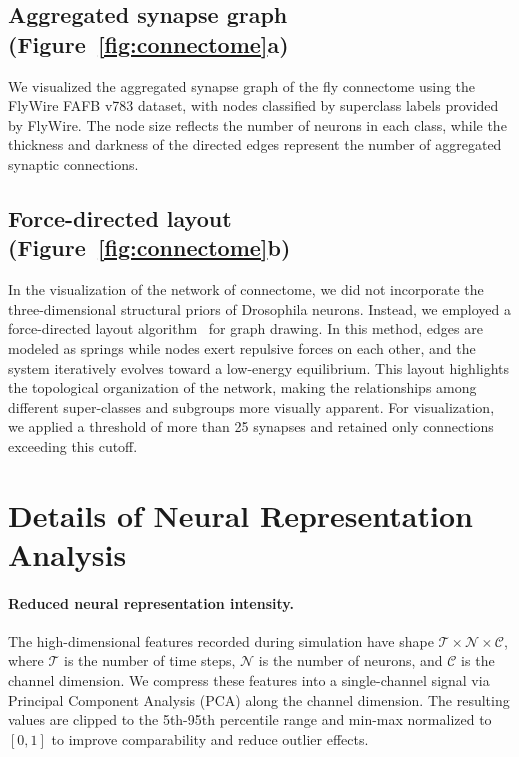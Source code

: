 \documentclass[a4paper]{easychair}
\begin{document}
\subsection{Aggregated synapse graph (Figure~\ref{fig:connectome}a)}

We visualized the aggregated synapse graph of the fly connectome using the FlyWire FAFB v783 dataset, with nodes classified by superclass labels provided by FlyWire. The node size reflects the number of neurons in each class, while the thickness and darkness of the directed edges represent the number of aggregated synaptic connections.

\subsection{Force-directed layout (Figure~\ref{fig:connectome}b)}

In the visualization of the network of connectome, we did not incorporate the three-dimensional structural priors of Drosophila neurons. Instead, we employed a force-directed layout algorithm~\citep{Kobourov2012} for graph drawing. In this method, edges are modeled as springs while nodes exert repulsive forces on each other, and the system iteratively evolves toward a low-energy equilibrium. This layout highlights the topological organization of the network, making the relationships among different super-classes and subgroups more visually apparent. For visualization, we applied a threshold of more than 25 synapses and retained only connections exceeding this cutoff.

\section{Details of Neural Representation Analysis}
\label{app:repr_analysis}

\paragraph{Reduced neural representation intensity.}
The high-dimensional features recorded during simulation have shape $\mathcal{T} \times \mathcal{N} \times \mathcal{C}$, where $\mathcal{T}$ is the number of time steps, $\mathcal{N}$ is the number of neurons, and $\mathcal{C}$ is the channel dimension. We compress these features into a single-channel signal via Principal Component Analysis (PCA) along the channel dimension. The resulting values are clipped to the 5th-95th percentile range and min-max normalized to $[0,1]$ to improve comparability and reduce outlier effects.
\end{document}
